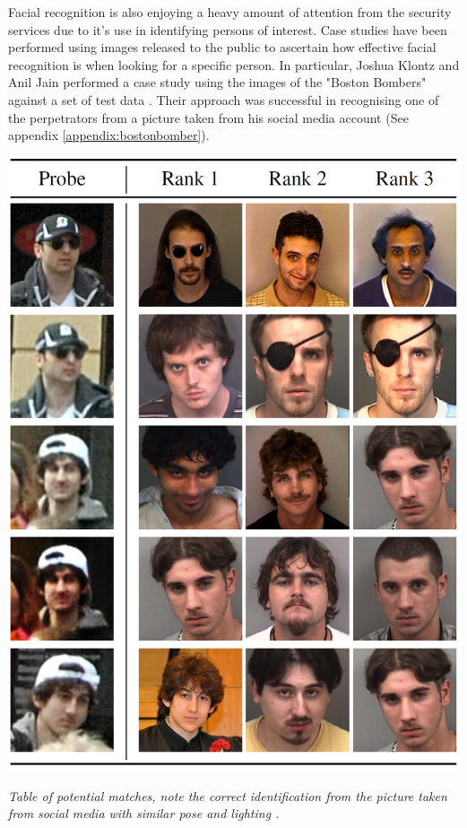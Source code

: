 \documentclass[12pt]{article}
\begin{document}
Facial recognition is also enjoying a heavy amount of attention from the security services due to it's use in identifying persons of interest. Case studies have been performed using images released to the public to ascertain how effective facial recognition is when looking for a specific person. In particular, Joshua Klontz and Anil Jain performed a case study using the images of the "Boston Bombers" against a set of test data \citep{bostonbombingcasestudy}. Their approach was successful in recognising one of the perpetrators from a picture taken from his social media account (See appendix \ref{appendix:bostonbomber}).

\begin{center}
\includegraphics[scale=0.5]{res/boston_bomber.png}

\textit{Table of potential matches, note the correct identification from the picture taken from social media with similar pose and lighting \citep{bostonbombingcasestudy}.}
\end{center}
\end{document}
